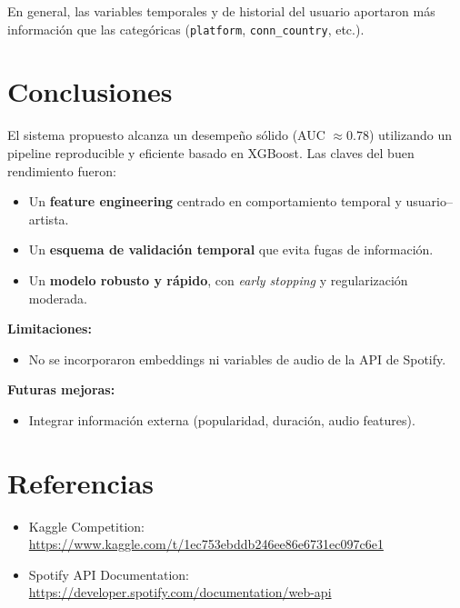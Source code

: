 \documentclass[12pt,a4paper]{article}
\begin{document}
En general, las variables temporales y de historial del usuario aportaron más información que las categóricas (\texttt{platform}, \texttt{conn\_country}, etc.).


\section{Conclusiones}

El sistema propuesto alcanza un desempeño sólido (AUC $\approx 0.78$) utilizando un pipeline reproducible y eficiente basado en XGBoost.  
Las claves del buen rendimiento fueron:
\begin{itemize}
    \item Un \textbf{feature engineering} centrado en comportamiento temporal y usuario–artista.
    \item Un \textbf{esquema de validación temporal} que evita fugas de información.
    \item Un \textbf{modelo robusto y rápido}, con \textit{early stopping} y regularización moderada.
\end{itemize}

\noindent \textbf{Limitaciones:}
\begin{itemize}
    \item No se incorporaron embeddings ni variables de audio de la API de Spotify.
\end{itemize}

\noindent \textbf{Futuras mejoras:}
\begin{itemize}
    \item Integrar información externa (popularidad, duración, audio features).

\end{itemize}


\section*{Referencias}
\begin{itemize}
    \item Kaggle Competition: \url{https://www.kaggle.com/t/1ec753ebddb246ee86e6731ec097c6e1}
    \item Spotify API Documentation: \url{https://developer.spotify.com/documentation/web-api}
\end{itemize}
\end{document}
